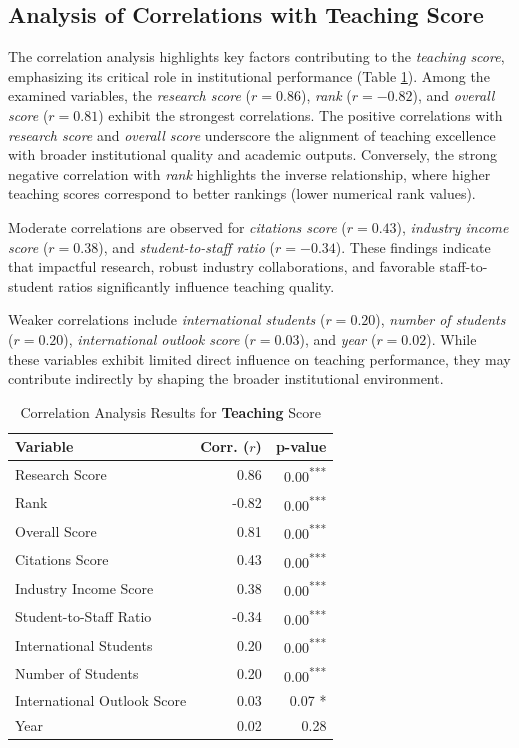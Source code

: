 \documentclass[conference]{IEEEtran}
\begin{document}
\subsection{Analysis of Correlations with Teaching Score}

The correlation analysis highlights key factors contributing to the \textit{teaching score}, emphasizing its critical role in institutional performance (Table \ref{tab:correlation_teaching}). Among the examined variables, the \textit{research score} ($r = 0.86$), \textit{rank} ($r = -0.82$), and \textit{overall score} ($r = 0.81$) exhibit the strongest correlations. The positive correlations with \textit{research score} and \textit{overall score} underscore the alignment of teaching excellence with broader institutional quality and academic outputs. Conversely, the strong negative correlation with \textit{rank} highlights the inverse relationship, where higher teaching scores correspond to better rankings (lower numerical rank values).

Moderate correlations are observed for \textit{citations score} ($r = 0.43$), \textit{industry income score} ($r = 0.38$), and \textit{student-to-staff ratio} ($r = -0.34$). These findings indicate that impactful research, robust industry collaborations, and favorable staff-to-student ratios significantly influence teaching quality.

Weaker correlations include \textit{international students} ($r = 0.20$), \textit{number of students} ($r = 0.20$), \textit{international outlook score} ($r = 0.03$), and \textit{year} ($r = 0.02$). While these variables exhibit limited direct influence on teaching performance, they may contribute indirectly by shaping the broader institutional environment.

\begin{table}[h!]
	\centering
	\caption{Correlation Analysis Results for \textbf{Teaching} Score}
	\label{tab:correlation_teaching}
	\begin{tabular}{|l|r|r|}
		\hline
		\textbf{Variable} & \textbf{Corr. ($r$)} & \textbf{p-value} \\
		\hline
		Research Score & 0.86 & 0.00\textsuperscript{***} \\
		Rank & -0.82 & 0.00\textsuperscript{***} \\
		Overall Score & 0.81 & 0.00\textsuperscript{***} \\
		Citations Score & 0.43 & 0.00\textsuperscript{***} \\
		Industry Income Score & 0.38 & 0.00\textsuperscript{***} \\
		Student-to-Staff Ratio & -0.34 & 0.00\textsuperscript{***} \\
		International Students & 0.20 & 0.00\textsuperscript{***} \\
		Number of Students & 0.20 & 0.00\textsuperscript{***} \\
		International Outlook Score & 0.03 & 0.07 * \\
		Year & 0.02 & 0.28 \\
		\hline
	\end{tabular}
\end{table}
\end{document}
